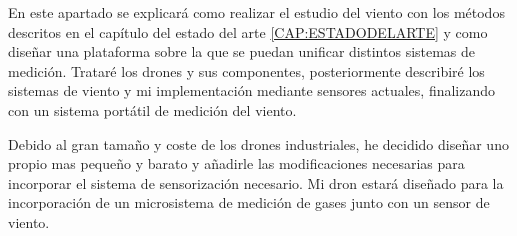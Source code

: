 
En este apartado se explicará como realizar el estudio del viento con los métodos descritos en el capítulo del estado del arte \ref{CAP:ESTADODELARTE} y como diseñar una plataforma sobre la que se puedan unificar distintos sistemas de medición. Trataré los drones y sus componentes, posteriormente describiré los sistemas de viento y mi implementación mediante sensores actuales, finalizando con un sistema portátil de medición del viento.

Debido al gran tamaño y coste de los drones industriales, he decidido diseñar uno propio mas pequeño y barato y añadirle las modificaciones necesarias para incorporar el sistema de sensorización necesario. Mi dron estará diseñado para la incorporación de un microsistema de medición de gases junto con un sensor de viento.
